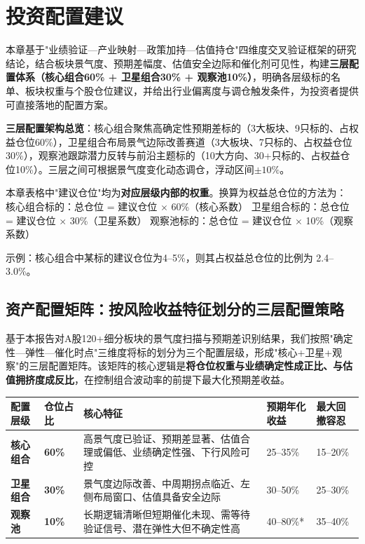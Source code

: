 
\chapter{投资配置建议}

本章基于"业绩验证—产业映射—政策加持—估值持仓"四维度交叉验证框架的研究结论，结合板块景气度、预期差幅度、估值安全边际和催化剂可见性，构建\textbf{三层配置体系（核心组合60\% + 卫星组合30\% + 观察池10\%）}，明确各层级标的名单、板块权重与个股仓位建议，并给出行业偏离度与调仓触发条件，为投资者提供可直接落地的配置方案。

\textbf{三层配置架构总览}：核心组合聚焦高确定性预期差标的（3大板块、9只标的、占权益仓位60\%），卫星组合布局景气边际改善赛道（3大板块、7只标的、占权益仓位30\%），观察池跟踪潜力反转与前沿主题标的（10大方向、30+只标的、占权益仓位10\%）。三层之间可根据景气度变化动态调仓，浮动区间$\pm{}10\%$。

\begin{keyinsight}[仓位换算方法]
本章表格中"建议仓位"均为\textbf{对应层级内部的权重}。换算为权益总仓位的方法为：
核心组合标的：总仓位 = 建议仓位 $\times$ 60\%（核心系数）
卫星组合标的：总仓位 = 建议仓位 $\times$ 30\%（卫星系数）
观察池标的：总仓位 = 建议仓位 $\times$ 10\%（观察系数）

\noindent 示例：核心组合中某标的建议仓位为4--5\%，则其占权益总仓位的比例为 2.4--3.0\%。
\end{keyinsight}

\section{资产配置矩阵：按风险收益特征划分的三层配置策略}

基于本报告对A股120+细分板块的景气度扫描与预期差识别结果，我们按照"确定性—弹性—催化时点"三维度将标的划分为三个配置层级，形成"核心+卫星+观察"的三层配置矩阵。该矩阵的核心逻辑是\textbf{将仓位权重与业绩确定性成正比、与估值拥挤度成反比}，在控制组合波动率的前提下最大化预期差收益。

\begin{exhibitbox}[表8-1：三层资产配置矩阵]
\centering
\small
\setlength{\aboverulesep}{0pt}
\setlength{\belowrulesep}{0pt}
\begin{tabularx}{\linewidth}{L{2.0cm} L{1.6cm} X L{2.0cm} L{2.2cm}}
\toprule
\textbf{配置层级} & \textbf{仓位占比} & \textbf{核心特征} & \textbf{预期年化收益} & \textbf{最大回撤容忍} \\
\midrule
{}
\textbf{核心组合} & \textbf{60\%} & 高景气度已验证、预期差显著、估值合理或偏低、业绩确定性强、下行风险可控 & 25--35\% & 15--20\% \\
\textbf{卫星组合} & \textbf{30\%} & 景气度边际改善、中周期拐点临近、左侧布局窗口、估值具备安全边际 & 30--50\% & 25--30\% \\
\textbf{观察池} & \textbf{10\%} & 长期逻辑清晰但短期催化未现、需等待验证信号、潜在弹性大但不确定性高 & 40--80\%* & 35--40\% \\
\bottomrule
\end{tabularx}
\end{exhibitbox}

